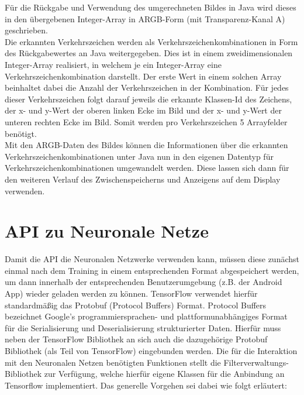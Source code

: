 \documentclass[12pt,a4paper,ngerman,enabledeprecatedfontcommands]{scrreprt}
\begin{document}
Für die Rückgabe und Verwendung des umgerechneten Bildes in Java wird dieses in den übergebenen Integer-Array in ARGB-Form (mit Transparenz-Kanal A) geschrieben.\\
Die erkannten Verkehrszeichen werden als Verkehrszeichenkombinationen in Form des Rückgabewertes an Java weitergegeben. Dies ist in einem zweidimensionalen Integer-Array realisiert, in welchem je ein Integer-Array eine Verkehrszeichenkombination darstellt. Der erste Wert in einem solchen Array beinhaltet dabei die Anzahl der Verkehrszeichen in der Kombination. Für jedes dieser Verkehrszeichen folgt darauf jeweils die erkannte Klassen-Id des Zeichens, der x- und y-Wert der oberen linken Ecke im Bild und der x- und y-Wert der unteren rechten Ecke im Bild. Somit werden pro Verkehrszeichen 5 Arrayfelder benötigt.\\
Mit den ARGB-Daten des Bildes können die Informationen über die erkannten Verkehrszeichenkombinationen unter Java nun in den eigenen Datentyp für Verkehrszeichenkombinationen umgewandelt werden. Diese lassen sich dann für den weiteren Verlauf des Zwischenspeicherns und Anzeigens auf dem Display verwenden.\\

\section{API zu Neuronale Netze}
\label{sec:schnittstellendokuAPINN}
Damit die API die Neuronalen Netzwerke verwenden kann, müssen diese zunächst einmal nach dem Training in einem entsprechenden Format abgespeichert werden, um dann innerhalb der entsprechenden Benutzerumgebung (z.B. der Android App) wieder geladen werden zu können. TensorFlow verwendet hierfür standardmäßig das \gls{Protobuf} (Protocol Buffers) Format. Protocol Buffers bezeichnet Google's programmiersprachen- und plattformunabhängiges Format für die Serialisierung und Deserialisierung strukturierter Daten. Hierfür muss neben der TensorFlow Bibliothek an sich auch die dazugehörige Protobuf Bibliothek (als Teil von TensorFlow) eingebunden werden.
Die für die Interaktion mit den Neuronalen Netzen benötigten Funktionen stellt die Filterverwaltungs-Bibliothek zur Verfügung, welche hierfür eigene Klassen für die Anbindung an Tensorflow implementiert.
Das generelle Vorgehen sei dabei wie folgt erläutert:
\end{document}
